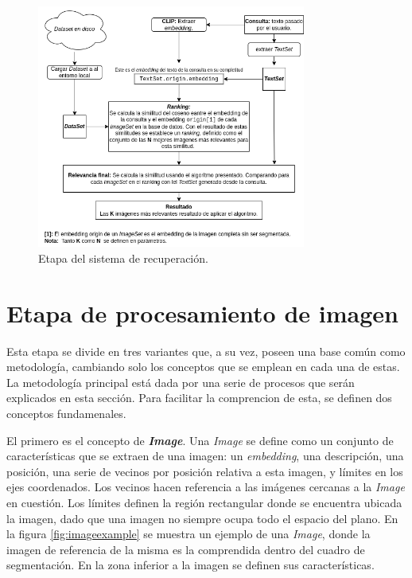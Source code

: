 \begin{figure}[H]
\centering
\includegraphics[height=80mm]{Graphics/SystemRetrieval.drawio.png}
\caption{Etapa del sistema de recuperaci\'on.}
\label{fig:etapa3}
\end{figure}


\section{Etapa de procesamiento de imagen}
Esta etapa se divide en tres variantes que, a su vez, poseen una base común como metodología, cambiando solo los conceptos que se emplean en cada una de estas. La metodología principal está dada por una serie de procesos que serán explicados en esta sección. Para facilitar la comprencion de esta, se definen dos conceptos fundamenales.

El primero es el concepto de \textbf{\textit{Image}}. Una \textit{Image} se define como un conjunto de características que se extraen de una imagen: un \textit{embedding}, una descripción, una posición, una serie de vecinos por posición relativa a esta imagen, y límites en los ejes coordenados. Los vecinos hacen referencia a las imágenes cercanas a la \textit{Image} en cuestión. Los límites definen la región rectangular donde se encuentra ubicada la imagen, dado que una imagen no siempre ocupa todo el espacio del plano. En la figura \ref{fig:imageexample} se muestra un ejemplo de una \textit{Image}, donde la imagen de referencia de la misma es la comprendida dentro del cuadro de segmentaci\'on. En la zona inferior a la imagen se definen sus caracter\'isticas.

